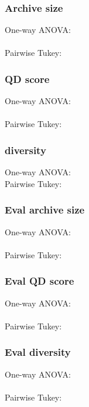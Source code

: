 \documentclass{article}
\begin{document}

    \subsubsection*{Archive size}
    One-way ANOVA:\\
    \\
    Pairwise Tukey:\\
    
    \subsubsection*{QD score}
    One-way ANOVA:\\
    \\
    Pairwise Tukey:\\
    
    \subsubsection*{diversity}
    One-way ANOVA:\\
    Pairwise Tukey:\\
    \subsubsection*{Eval archive size}
    One-way ANOVA:\\
    \\
    Pairwise Tukey:\\
    
    \subsubsection*{Eval QD score}
    One-way ANOVA:\\
    \\
    Pairwise Tukey:\\
    
    \subsubsection*{Eval diversity}
    One-way ANOVA:\\
    \\
    Pairwise Tukey:\\
    
\end{document}
